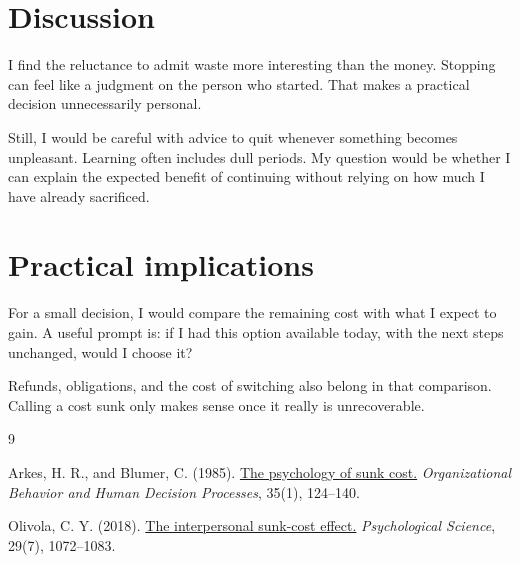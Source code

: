 \documentclass[11pt,a4paper]{article}
\begin{document}
\section{Discussion}

I find the reluctance to admit waste more interesting than the money.
Stopping can feel like a judgment on the person who started. That makes
a practical decision unnecessarily personal.

Still, I would be careful with advice to quit whenever something becomes
unpleasant. Learning often includes dull periods. My question would be
whether I can explain the expected benefit of continuing without relying
on how much I have already sacrificed.

\section{Practical implications}

For a small decision, I would compare the remaining cost with what I
expect to gain. A useful prompt is: if I had this option available today,
with the next steps unchanged, would I choose it?

Refunds, obligations, and the cost of switching also belong in that
comparison. Calling a cost sunk only makes sense once it really is
unrecoverable.

\renewcommand{\refname}{References}
\begin{thebibliography}{9}
\small
\setlength{\itemsep}{0.35em}

Arkes, H. R., and Blumer, C. (1985).
\href{https://www.sciencedirect.com/science/article/pii/0749597885900494}
{The psychology of sunk cost.}
\textit{Organizational Behavior and Human Decision Processes}, 35(1), 124--140.

Olivola, C. Y. (2018).
\href{https://doi.org/10.1177/0956797617752641}
{The interpersonal sunk-cost effect.}
\textit{Psychological Science}, 29(7), 1072--1083.

\end{thebibliography}
\end{document}
